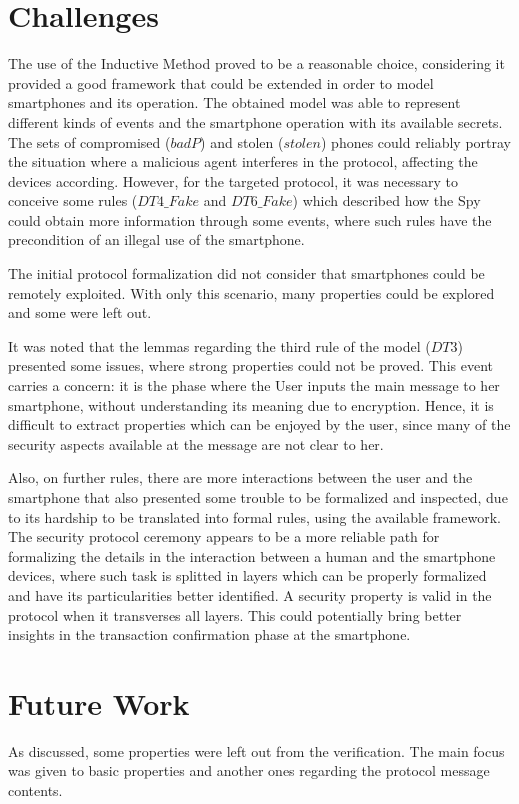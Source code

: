 \section{Challenges}
The use of the Inductive Method proved to be a reasonable choice, considering it provided a good framework that could be extended in order to model smartphones and its operation. The obtained model was able to represent different kinds of events and the smartphone operation with its available secrets. The sets of compromised ($badP$) and stolen ($stolen$) phones could reliably portray the situation where a malicious agent interferes in the protocol, affecting the devices according. However, for the targeted protocol, it was necessary to conceive some rules ($DT4\_Fake$ and $DT6\_Fake$) which described how the Spy could obtain more information through some events, where such rules have the precondition of an illegal use of the smartphone.

The initial protocol formalization did not consider that smartphones could be remotely exploited. With only this scenario, many properties could be explored and some were left out.

It was noted that the lemmas regarding the third rule of the model ($DT3$) presented some issues, where strong properties could not be proved. This event carries a concern: it is the phase where the User inputs the main message to her smartphone, without understanding its meaning due to encryption. Hence, it is difficult to extract properties which can be enjoyed by the user, since many of the security aspects available at the message are not clear to her.

Also, on further rules, there are more interactions between the user and the smartphone that also presented some trouble to be formalized and inspected, due to its hardship to be translated into formal rules, using the available framework. The security protocol ceremony \cite{Ellison07} appears to be a more reliable path for formalizing the details in the interaction between a human and the smartphone devices, where such task is splitted in layers which can be properly formalized and have its particularities better identified. A security property is valid in the protocol when it transverses all layers. This could potentially bring better insights in the transaction confirmation phase at the smartphone.


\section{Future Work}
As discussed, some properties were left out from the verification. The main focus was given to basic properties and another ones regarding the protocol message contents.

